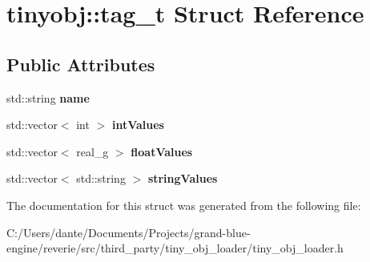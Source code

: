 \hypertarget{structtinyobj_1_1tag__t}{}\section{tinyobj\+::tag\+\_\+t Struct Reference}
\label{structtinyobj_1_1tag__t}
\subsection*{Public Attributes}
\begin{DoxyCompactItemize}
\item 
\mbox{\label{structtinyobj_1_1tag__t_a9b3650154d2fbd83dad945ebcf6bd448}} 
std\+::string {\bfseries name}
\item 
\mbox{\label{structtinyobj_1_1tag__t_adc6a6682263abaa11e3ec62b910bb80d}} 
std\+::vector$<$ int $>$ {\bfseries int\+Values}
\item 
\mbox{\label{structtinyobj_1_1tag__t_aa5c2bfe4043c469e4195d135b1393708}} 
std\+::vector$<$ real\+\_\+g $>$ {\bfseries float\+Values}
\item 
\mbox{\label{structtinyobj_1_1tag__t_a25634eea923961fd5b2520ea782397e8}} 
std\+::vector$<$ std\+::string $>$ {\bfseries string\+Values}
\end{DoxyCompactItemize}


The documentation for this struct was generated from the following file\+:\begin{DoxyCompactItemize}
\item 
C\+:/\+Users/dante/\+Documents/\+Projects/grand-\/blue-\/engine/reverie/src/third\+\_\+party/tiny\+\_\+obj\+\_\+loader/tiny\+\_\+obj\+\_\+loader.\+h\end{DoxyCompactItemize}
